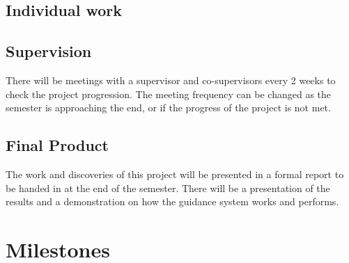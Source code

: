 \documentclass[a4paper,10pt]{article}
\begin{document}
	\subsection{Individual work}
	
	
	\subsection{Supervision}
	There will be meetings with a supervisor and co-supervisors every 2 weeks to check the project progression. The meeting frequency can be changed as the semester is approaching the end, or if the progress of the project is not met.
	
	\subsection{Final Product}
	The work and discoveries of this project will be presented in a formal report to be handed in at the end of the semester. There will be a presentation of the results and a demonstration on how the guidance system works and performs.

\section{Milestones}
\end{document}
